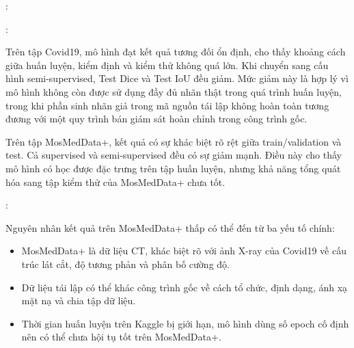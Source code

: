 \begin{frame}{\secname: \subsecname}

    \begin{table}[H]
        \centering
        \caption{Kết quả huấn luyện, kiểm định và kiểm thử của LViT trên các cấu hình thực nghiệm}
    \end{table}

\end{frame}


\begin{frame}{\secname: \subsecname}

    Trên tập Covid19, mô hình đạt kết quả tương đối ổn định, cho thấy khoảng cách giữa huấn luyện, kiểm định và kiểm thử không quá lớn. Khi chuyển sang cấu hình semi-supervised, Test Dice và Test IoU đều giảm. Mức giảm này là hợp lý vì mô hình không còn được sử dụng đầy đủ nhãn thật trong quá trình huấn luyện, trong khi phần sinh nhãn giả trong mã nguồn tái lập không hoàn toàn tương đương với một quy trình bán giám sát hoàn chỉnh trong công trình gốc.

    \bigskip
    Trên tập MosMedData+, kết quả có sự khác biệt rõ rệt giữa train/validation và test. Cả supervised và semi-supervised đều có sự giảm mạnh. Điều này cho thấy mô hình có học được đặc trưng trên tập huấn luyện, nhưng khả năng tổng quát hóa sang tập kiểm thử của MosMedData+ chưa tốt.

\end{frame}

\begin{frame}{\secname: \subsecname}

   Nguyên nhân kết quả trên MosMedData+ thấp có thể đến từ ba yếu tố chính:

   \begin{itemize}
       \item MosMedData+ là dữ liệu CT, khác biệt rõ với ảnh X-ray của Covid19 về cấu trúc lát cắt, độ tương phản và phân bố cường độ.
       \item Dữ liệu tái lập có thể khác công trình gốc về cách tổ chức, định dạng, ánh xạ mặt nạ và chia tập dữ liệu.
       \item Thời gian huấn luyện trên Kaggle bị giới hạn, mô hình dùng số epoch cố định nên có thể chưa hội tụ tốt trên MosMedData+.
   \end{itemize}

\end{frame}

